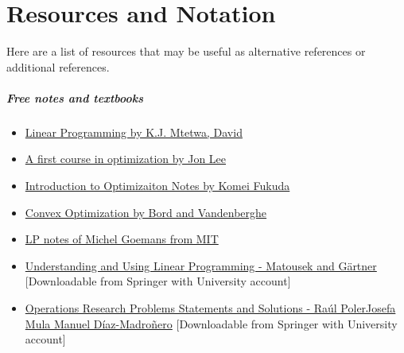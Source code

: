 



\chapter{Resources and Notation}
Here are a list of resources that may be useful as alternative references or additional references.

\paragraph{\textbf{Free notes and textbooks}}
\begin{itemize}
\item \href{https://oer.avu.org/handle/123456789/780}{Linear Programming by K.J. Mtetwa, David}
\item \href{http://www.optimization-online.org/DB_FILE/2013/12/4161.pdf}{A first course in optimization by Jon Lee}
\item \href{https://people.inf.ethz.ch/fukudak/lect/opt2011/aopt11note1.pdf}{Introduction to Optimizaiton Notes by Komei Fukuda}
\item \href{https://web.stanford.edu/~boyd/cvxbook/}{Convex Optimization by Bord and Vandenberghe}
\item  \href{http://math.mit.edu/~goemans/18310S15/lpnotes310.pdf}{LP notes of Michel Goemans from MIT }
\item \href{https://www.springer.com/gp/book/9783540306979}{Understanding and Using Linear Programming - Matousek and G\"artner} [Downloadable from Springer with University account]
\item \href{https://rd.springer.com/book/10.1007/978-1-4471-5577-5}{Operations Research Problems
Statements and Solutions
-
Ra\'ul PolerJosefa Mula Manuel D\'iaz-Madro\~nero} [Downloadable from Springer with University account]
\end{itemize}
